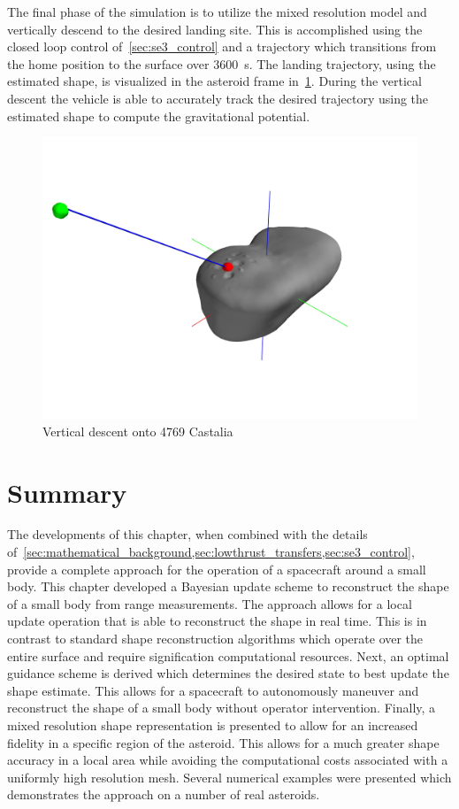 The final phase of the simulation is to utilize the mixed resolution model and vertically descend to the desired landing site. 
This is accomplished using the closed loop control of~\cref{sec:se3_control} and a trajectory which transitions from the home position to the surface over \SI{3600}{\second}.
The landing trajectory, using the estimated shape, is visualized in the asteroid frame in~\cref{fig:castalia_landing}.
During the vertical descent the vehicle is able to accurately track the desired trajectory using the estimated shape to compute the gravitational potential.
\begin{figure}[htbp]
    \centering
    \includegraphics[width=\textwidth]{figures/computational_geometry/dynamic_exploration/castalia/land/asteroid_trajectory.jpg}
    \caption{Vertical descent onto 4769 Castalia~\label{fig:castalia_landing}}
\end{figure}

\section{Summary}

The developments of this chapter, when combined with the details of~\cref{sec:mathematical_background,sec:lowthrust_transfers,sec:se3_control}, provide a complete approach for the operation of a spacecraft around a small body.
This chapter developed a Bayesian update scheme to reconstruct the shape of a small body from range measurements. 
The approach allows for a local update operation that is able to reconstruct the shape in real time. 
This is in contrast to standard shape reconstruction algorithms which operate over the entire surface and require signification computational resources.
Next, an optimal guidance scheme is derived which determines the desired state to best update the shape estimate. 
This allows for a spacecraft to autonomously maneuver and reconstruct the shape of a small body without operator intervention.
Finally, a mixed resolution shape representation is presented to allow for an increased fidelity in a specific region of the asteroid.
This allows for a much greater shape accuracy in a local area while avoiding the computational costs associated with a uniformly high resolution mesh.
Several numerical examples were presented which demonstrates the approach on a number of real asteroids.

